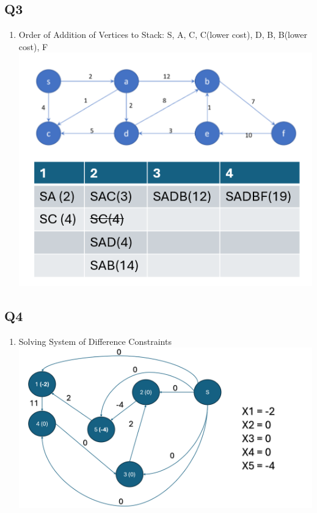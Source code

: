 \documentclass{article}
\begin{document}
\subsection*{Q3}
\begin{enumerate}[label=(\alph*)]
    \item Order of Addition of Vertices to Stack: S, A, C, C(lower cost), D, B, B(lower cost), F 
    \subitem \includegraphics[width=.75\textwidth]{problem3.png} 
\end{enumerate}

\subsection*{Q4}
\begin{enumerate}[label=(\alph*)]
    \item Solving System of Difference Constraints
    \subitem \includegraphics[width=.75\textwidth]{problem4.png}
\end{enumerate}

\end{document}
